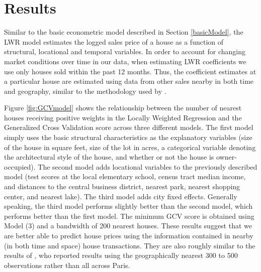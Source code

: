 \documentclass{article}\usepackage{graphicx, color}
\begin{document}
\section{Results}
Similar to the basic econometric model described in Section \ref{basicModel}, the LWR model estimates the logged sales price of a house as a function of structural, locational and temporal variables. In order to account for changing market conditions over time in our data, when estimating LWR coefficients we use only houses sold within the past 12 months. Thus, the coefficient estimates at a particular house are estimated using data from other sales nearby in both time and geography, similar to the methodology used by \citet{Nappi-Choulet2011}.

Figure \ref{fig:GCVmodel} shows the relationship between the number of nearest houses receiving positive weights in the Locally Weighted Regression and the Generalized Cross Validation score across three different models. The first model simply uses the basic structural characteristics as the explanatory variables (size of the house in square feet, size of the lot in acres, a categorical variable denoting the architectural style of the house, and whether or not the house is owner-occupied). The second model adds locational variables to the previously described model (test scores at the local elementary school, census tract median income, and distances to the central business district, nearest park, nearest shopping center, and nearest lake). The third model adds city fixed effects. Generally speaking, the third model performs slightly better than the second model, which performs better than the first model. The minimum GCV score is obtained using Model (3) and a bandwidth of 200 nearest houses. These results suggest that we are better able to predict house prices using the information contained in nearby (in both time and space) house transactions. They are also roughly similar to the results of \citet{Nappi-Choulet2011}, who reported results using the geographically nearest 300 to 500 observations rather than all across Paris.
\end{document}
